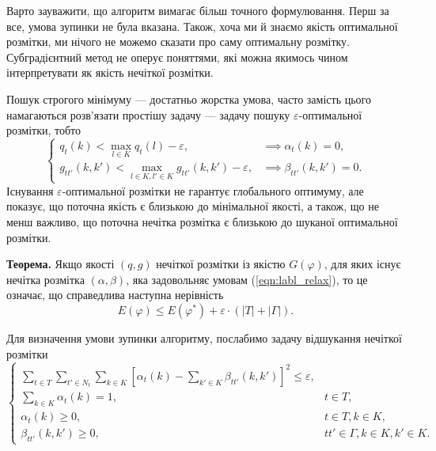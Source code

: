 Варто зауважити, що алгоритм вимагає більш точного формулювання. Перш за все, 
умова зупинки не була вказана. Також, хоча ми й знаємо якість оптимальної розмітки, 
ми нічого не можемо сказати про саму оптимальну розмітку. Субградієнтний метод
не оперує поняттями, які можна якимось чином інтерпретувати як якість нечіткої розмітки.

Пошук строгого мінімуму --- достатньо жорстка умова, часто замість цього намагаються 
розв'язати простішу задачу --- задачу пошуку $\varepsilon$-оптимальної розмітки, тобто
\begin{equation}
    \begin{cases}
    \label{eqn:labl_relax}
      q_t(k) < \max\limits_{l\in K}q_t(l)-\varepsilon , & \implies \alpha_t(k)=0,\\
      g_{tt'}(k,k')< \max\limits_{l\in K, l'\in K}g_{tt'}(k,k')-\varepsilon, & \implies \beta_{tt'}(k,k')=0.
    \end{cases}
  \end{equation}
Існування $\varepsilon$-оптимальної розмітки не гарантує глобального оптимуму, 
але показує, що поточна якість є близькою до мінімальної якості, а також, що не менш важливо,
що поточна нечітка розмітка є близькою до шуканої оптимальної розмітки.

\textbf{Теорема.\cite{lopatka_stop_cond}} Якщо якості $(q,g)$ нечіткої розмітки із якістю $G(\varphi)$, для 
яких існує нечітка розмітка $(\alpha, \beta)$, яка задовольняє умовам (\ref{eqn:labl_relax}), 
то це означає, що справедлива наступна нерівність
\begin{equation*}
    E(\varphi)\leq E(\varphi^*) + \varepsilon\cdot (|T|+|\Gamma|).
\end{equation*}

Для визначення умови зупинки алгоритму, послабимо задачу відшукання нечіткої розмітки
\begin{equation*}
    \begin{cases}
      \sum\limits_{t\in T}\sum\limits_{t'\in N_t}\sum\limits_{k\in K}\left[\alpha_t(k)-\sum\limits_{k' \in K} \beta_{tt'}(k,k')\right]^2\leq \varepsilon,\\
      \sum\limits_{k \in K} \alpha_t(k)=1, & t\in T,\\
      \alpha_t(k)\geq 0, & t\in T, k\in K,\\
      \beta_{tt'}(k,k')\geq 0, & tt'\in \Gamma, k\in K, k'\in K.
    \end{cases}
  \end{equation*}

